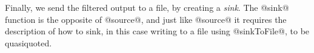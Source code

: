 Finally, we send the filtered output to a file, by creating a \emph{sink}.
The @sink@ function is the opposite of @source@, and just like @source@ it requires the description of how to sink, in this case writing to a file using @sinkToFile@, to be quasiquoted.



% 
% 

% 
% 
% 




